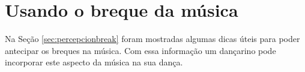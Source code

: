 

\clearpage
\section{Usando o breque da música}
\label{sec:UsandoBreak}

Na Seção \ref{sec:percepcionbreak} foram mostradas algumas dicas 
úteis para poder antecipar os breques na música.
Com essa informação um dançarino pode incorporar este aspecto da música na sua dança.

